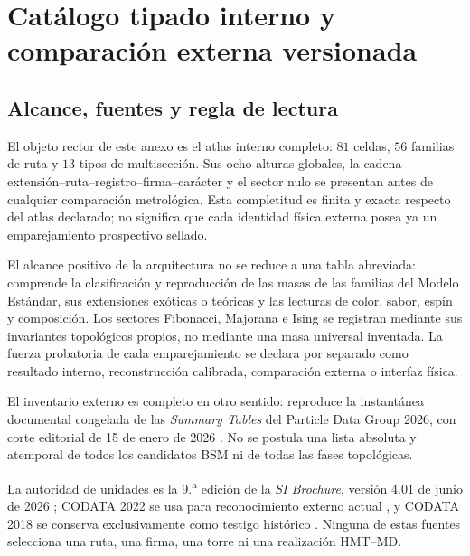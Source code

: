 \chapter{Catálogo tipado interno y comparación externa versionada}
\label{app:catalogo-tipado-completo}

\section{Alcance, fuentes y regla de lectura}

El objeto rector de este anexo es el atlas interno completo: \(81\) celdas,
\(56\) familias de ruta y \(13\) tipos de multisección. Sus ocho alturas
globales, la cadena extensión--ruta--registro--firma--carácter y el sector nulo
se presentan antes de cualquier comparación metrológica. Esta completitud es
finita y exacta respecto del atlas declarado; no significa que cada identidad
física externa posea ya un emparejamiento prospectivo sellado.

El alcance positivo de la arquitectura no se reduce a una tabla abreviada:
comprende la clasificación y reproducción de las masas de las familias del
Modelo Estándar, sus extensiones exóticas o teóricas y las lecturas de color,
sabor, espín y composición. Los sectores Fibonacci, Majorana e Ising se
registran mediante sus invariantes topológicos propios, no mediante una masa
universal inventada. La fuerza probatoria de cada emparejamiento se declara
por separado como resultado interno, reconstrucción calibrada, comparación
externa o interfaz física.

El inventario externo es completo en otro sentido: reproduce la instantánea
documental congelada de las \emph{Summary Tables} del Particle Data Group
2026, con corte editorial de 15 de enero de 2026 \cite{PDG2026}. No se postula
una lista absoluta y atemporal de todos los candidatos BSM ni de todas las
fases topológicas.

La autoridad de unidades es la 9.\textsuperscript{a} edición de la
\emph{SI Brochure}, versión 4.01 de junio de 2026 \cite{BIPMSI2026}; CODATA
2022 se usa para reconocimiento externo actual \cite{CODATA2022}, y CODATA
2018 se conserva exclusivamente como testigo histórico
\cite{CODATA2018}. Ninguna de estas fuentes selecciona una ruta, una firma,
una torre ni una realización HMT--MD.

